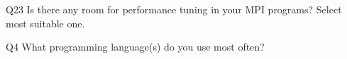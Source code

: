 \begin{description}%
\item{Q23} Is there any room for performance tuning in your MPI programs? Select most suitable one.%
\item{Q4} What programming language(s) do you use most often?%
\end{description}%
